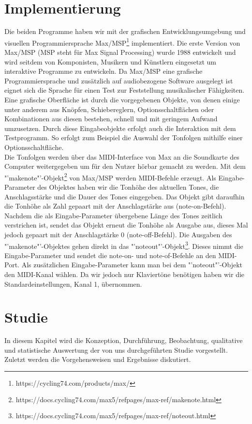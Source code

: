 \documentclass{acm_proc_article-sp}
\begin{document}
\section{Implementierung}
Die beiden Programme haben wir mit der grafischen Entwicklungsumgebung und visuellen Programmiersprache Max\slash MSP\footnote{https://cycling74.com/products/max/} implementiert. Die erste Version von Max\slash MSP (MSP steht für Max Signal Processing) \cite{wiki:max} wurde 1988 entwickelt und wird seitdem von Komponisten, Musikern und Künstlern eingesetzt um interaktive Programme zu entwickeln. Da Max\slash MSP eine grafische Programmiersprache und zusätzlich auf audiobezogene Software ausgelegt ist eignet sich die Sprache für einen Test zur Feststellung musikalischer Fähigkeiten.\\
Eine grafische Oberfläche ist durch die vorgegebenen Objekte, von denen einige unter anderem aus Knöpfen, Schiebereglern, Optionsschaltflächen oder Kombinationen aus diesen bestehen, schnell und mit geringem Aufwand umzusetzen. Durch diese Eingabeobjekte erfolgt auch die Interaktion mit dem Testprogramm. So erfolgt zum Beispiel die Auswahl der Tonfolgen mithilfe einer Optionsschaltfläche.\\
Die Tonfolgen werden über das MIDI-Interface von Max an die Soundkarte des Computer weitergegeben um für den Nutzer hörbar gemacht zu werden. Mit dem "'makenote"'-Objekt\footnote{https://docs.cycling74.com/max5/refpages/max-ref/makenote.html} von Max\slash MSP werden MIDI-Befehle erzeugt. Als Eingabe-Parameter des Objektes haben wir die Tonhöhe des aktuellen Tones, die Anschlagsstärke und die Dauer des Tones  eingegeben. Das Objekt gibt daraufhin die Tonhöhe als Zahl gepaart mit der Anschlagstärke aus (note-on-Befehl). Nachdem die als Eingabe-Parameter übergebene Länge des Tones zeitlich verstrichen ist, sendet das Objekt erneut die Tonhöhe als Ausgabe aus, dieses Mal jedoch gepaart mit der Anschlagstärke 0 (note-off-Befehl). Die Ausgaben des "'makenote"'-Objektes gehen direkt in das "'noteout"'-Objekt\footnote{https://docs.cycling74.com/max5/refpages/max-ref/noteout.html}. Dieses nimmt die Eingabe-Parameter und sendet die note-on- und note-of-Befehle an den MIDI-Port. Als zusätzlichen Eingabe-Parameter kann man bei dem "'noteout"'-Objekt den MIDI-Kanal wählen. Da wir jedoch nur Klaviertöne benötigen haben wir die Standardeinstellungen, Kanal 1, übernommen.

\section{Studie}
In diesem Kapitel wird die Konzeption, Durchführung, Beobachtung, qualitative und statistische Auswertung der von uns durchgeführten Studie vorgestellt. Zuletzt werden die Vorgehensweisen und Ergebnisse diskutiert.
\end{document}
